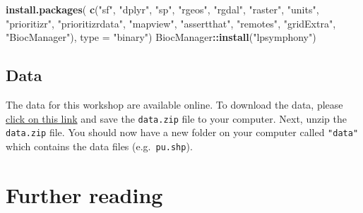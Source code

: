 \documentclass[
  12pt,
]{book}
\newenvironment{Shaded}{\begin{snugshade}}{\end{snugshade}}
\newcommand{\DataTypeTok}[1]{\textcolor[rgb]{0.13,0.29,0.53}{#1}}
\newcommand{\KeywordTok}[1]{\textcolor[rgb]{0.13,0.29,0.53}{\textbf{#1}}}
\newcommand{\NormalTok}[1]{#1}
\newcommand{\OperatorTok}[1]{\textcolor[rgb]{0.81,0.36,0.00}{\textbf{#1}}}
\newcommand{\StringTok}[1]{\textcolor[rgb]{0.31,0.60,0.02}{#1}}
\begin{document}
\begin{Shaded}
\begin{Highlighting}[]
\KeywordTok{install.packages}\NormalTok{(}
  \KeywordTok{c}\NormalTok{(}\StringTok{"sf"}\NormalTok{, }\StringTok{"dplyr"}\NormalTok{, }\StringTok{"sp"}\NormalTok{, }\StringTok{"rgeos"}\NormalTok{, }\StringTok{"rgdal"}\NormalTok{, }\StringTok{"raster"}\NormalTok{, }\StringTok{"units"}\NormalTok{, }\StringTok{"prioritizr"}\NormalTok{,}
    \StringTok{"prioritizrdata"}\NormalTok{, }\StringTok{"mapview"}\NormalTok{, }\StringTok{"assertthat"}\NormalTok{, }\StringTok{"remotes"}\NormalTok{, }\StringTok{"gridExtra"}\NormalTok{,}
    \StringTok{"BiocManager"}\NormalTok{),}
  \DataTypeTok{type =} \StringTok{"binary"}\NormalTok{)}
\NormalTok{BiocManager}\OperatorTok{::}\KeywordTok{install}\NormalTok{(}\StringTok{"lpsymphony"}\NormalTok{)}
\end{Highlighting}
\end{Shaded}

\hypertarget{data-setup}{%
\subsection{Data}\label{data-setup}}

The data for this workshop are available online. To download the data, please \href{https://github.com/prioritizr/massey-workshop/raw/master/data.zip}{click on this link} and save the \texttt{data.zip} file to your computer. Next, unzip the \texttt{data.zip} file. You should now have a new folder on your computer called \texttt{"data"} which contains the data files (e.g.~\texttt{pu.shp}).

\hypertarget{further-reading}{%
\section{Further reading}\label{further-reading}}
\end{document}

